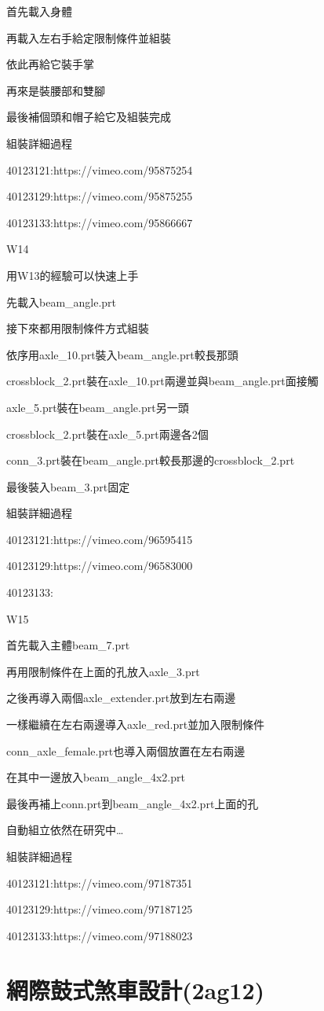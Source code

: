 \documentclass[]{article}
\begin{document}
首先載入身體

再載入左右手給定限制條件並組裝

依此再給它裝手掌

再來是裝腰部和雙腳

最後補個頭和帽子給它及組裝完成

組裝詳細過程

40123121:https://vimeo.com/95875254

40123129:https://vimeo.com/95875255

40123133:https://vimeo.com/95866667

W14

用W13的經驗可以快速上手

先載入beam\_angle.prt

接下來都用限制條件方式組裝

依序用axle\_10.prt裝入beam\_angle.prt較長那頭

crossblock\_2.prt裝在axle\_10.prt兩邊並與beam\_angle.prt面接觸

axle\_5.prt裝在beam\_angle.prt另一頭

crossblock\_2.prt裝在axle\_5.prt兩邊各2個

conn\_3.prt裝在beam\_angle.prt較長那邊的crossblock\_2.prt

最後裝入beam\_3.prt固定

組裝詳細過程

40123121:https://vimeo.com/96595415

40123129:https://vimeo.com/96583000

40123133:

W15

首先載入主體beam\_7.prt

再用限制條件在上面的孔放入axle\_3.prt

之後再導入兩個axle\_extender.prt放到左右兩邊

一樣繼續在左右兩邊導入axle\_red.prt並加入限制條件

conn\_axle\_female.prt也導入兩個放置在左右兩邊

在其中一邊放入beam\_angle\_4x2.prt

最後再補上conn.prt到beam\_angle\_4x2.prt上面的孔

自動組立依然在研究中\ldots{}

組裝詳細過程

40123121:https://vimeo.com/97187351

40123129:https://vimeo.com/97187125

40123133:https://vimeo.com/97188023

\section{網際鼓式煞車設計(2ag12)}\label{ux7db2ux969bux9f13ux5f0fux715eux8ecaux8a2dux8a082ag12}
\end{document}
